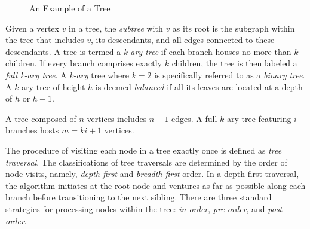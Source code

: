 \begin{figure}[t]
\centering
{}
\caption{\label{fig:BinaryTree-Example}An Example of a Tree}
\end{figure}

Given a vertex $v$ in a tree, the \emph{subtree} with $v$ as its root is the subgraph within the tree that includes $v$, its descendants, and all edges connected to these descendants. A tree is termed a \emph{k-ary tree} if each branch houses no more than $k$ children. If every branch comprises exactly $k$ children, the tree is then labeled a \emph{full k-ary tree}. A \emph{k-ary} tree where $k=2$ is specifically referred to as a \emph{binary tree}. A $k$-ary tree of height $h$ is deemed \emph{balanced} if all its leaves are located at a depth of $h$ or $h-1$.

\begin{example}
A tree composed of $n$ vertices includes $n-1$ edges. A full $k$-ary tree featuring $i$ branches hosts $m=ki+1$ vertices.
\end{example}

The procedure of visiting each node in a tree exactly once is defined as \emph{tree traversal}. The classifications of tree traversals are determined by the order of node visits, namely, \emph{depth-first} and \emph{breadth-first} order. In a depth-first traversal, the algorithm initiates at the root node and ventures as far as possible along each branch before transitioning to the next sibling. There are three standard strategies for processing nodes within the tree: \emph{in-order}, \emph{pre-order}, and \emph{post-order}.

